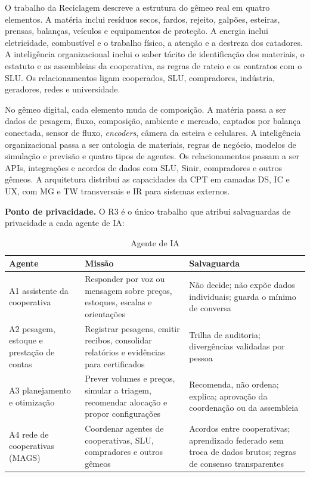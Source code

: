 \documentclass[12pt,a4paper,article,oneside,english,brazil]{abntex2}
\newcommand{\fontetab}[1]{\par\vspace{3pt}{\small\noindent Fonte: #1\par}}
\begin{document}
O trabalho da Reciclagem descreve a estrutura do gêmeo real em quatro elementos. A matéria inclui resíduos secos, fardos, rejeito, galpões, esteiras, prensas, balanças, veículos e equipamentos de proteção. A energia inclui eletricidade, combustível e o trabalho físico, a atenção e a destreza dos catadores. A inteligência organizacional inclui o saber tácito de identificação dos materiais, o estatuto e as assembleias da cooperativa, as regras de rateio e os contratos com o SLU. Os relacionamentos ligam cooperados, SLU, compradores, indústria, geradores, redes e universidade.

No gêmeo digital, cada elemento muda de composição. A matéria passa a ser dados de pesagem, fluxo, composição, ambiente e mercado, captados por balança conectada, sensor de fluxo, \textit{encoders}, câmera da esteira e celulares. A inteligência organizacional passa a ser ontologia de materiais, regras de negócio, modelos de simulação e previsão e quatro tipos de agentes. Os relacionamentos passam a ser APIs, integrações e acordos de dados com SLU, Sinir, compradores e outros gêmeos. A arquitetura distribui as capacidades da CPT em camadas DS, IC e UX, com MG e TW transversais e IR para sistemas externos.

\textbf{Ponto de privacidade.} O R3 é o único trabalho que atribui salvaguardas de privacidade a cada agente de IA:

\begin{table}[!htbp]
\centering
\caption{Agente de IA}
\label{tab:agentes}
\small
\begin{tabularx}{\linewidth}{>{\raggedright\arraybackslash}p{3.4cm} Y Y}
\hline
\textbf{Agente} & \textbf{Missão} & \textbf{Salvaguarda}\\
\hline
A1 assistente da cooperativa & Responder por voz ou mensagem sobre preços, estoques, escalas e orientações & Não decide; não expõe dados individuais; guarda o mínimo de conversa\\
A2 pesagem, estoque e prestação de contas & Registrar pesagens, emitir recibos, consolidar relatórios e evidências para certificados & Trilha de auditoria; divergências validadas por pessoa\\
A3 planejamento e otimização & Prever volumes e preços, simular a triagem, recomendar alocação e propor configurações & Recomenda, não ordena; explica; aprovação da coordenação ou da assembleia\\
A4 rede de cooperativas (MAGS) & Coordenar agentes de cooperativas, SLU, compradores e outros gêmeos & Acordos entre cooperativas; aprendizado federado sem troca de dados brutos; regras de consenso transparentes\\
\hline
\end{tabularx}
\fontetab{Elaborado pelo autor (2026).}
\end{table}
\end{document}
